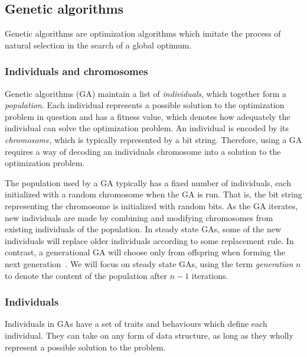 \subsection{Genetic algorithms} 
Genetic algorithms are optimization algorithms which imitate the process of natural selection in the search of a global optimum.

\subsubsection{Individuals and chromosomes}
Genetic algorithms (GA) maintain a list of \emph{individuals}, which together form a \emph{population}. Each individual represents a possible solution to the optimization problem in question and has a fitness value, which denotes how adequately the individual can solve the optimization problem. An individual is encoded by its \emph{chromosome}, which is typically represented by a bit string. Therefore, using a GA requires a way of decoding an individuals chromosome into a solution to the optimization problem.

The population used by a GA typically has a fixed number of individuals, each initialized with a random chromosome when the GA is run. That is, the bit string representing the chromosome is initialized with random bits. As the GA iterates, new individuals are made by combining and modifying chromosomes from existing individuals of the population. In steady state GAs, some of the new individuals will replace older individuals according to some replacement rule. In contrast, a generational GA will choose only from offspring when forming the next generation~\cite{fogarty, Syswerda:1989:UCG:645512.657265, Whitley:1989:GAS:93126.93169}. We will focus on steady state GAs, using the term \emph{generation} $n$ to denote the content of the population after $n - 1$ iterations.

\subsubsection{Individuals}
Individuals in GAs have a set of traits and behaviours which define each individual. They can take on any form of data structure, as long as they wholly represent a possible solution to the problem. 




